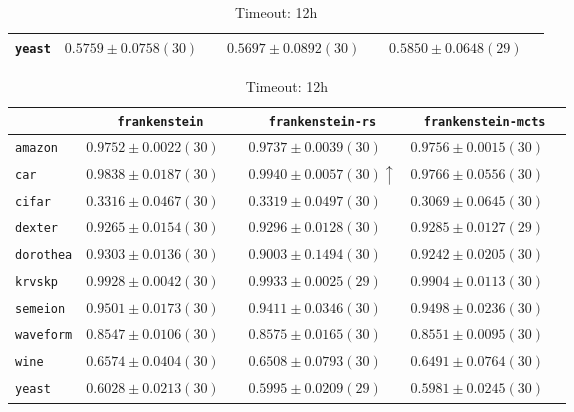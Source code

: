 \begin{table}[ht]
\begin{subtable}{\textwidth}
\begin{tabular}{l|ccc}
            \texttt{yeast} & $ 0.5759 \pm 0.0758 (30) \phantom{\downarrow}$ & $ 0.5697 \pm 0.0892 (30) \phantom{\downarrow}$ & $ 0.5850 \pm 0.0648 (29) \phantom{\downarrow}$\\
            \hline
        \end{tabular}
    \end{subtable}
    \par\bigskip
    \begin{subtable}{\textwidth}
        \centering
        \caption{Timeout: 12h}
        \begin{tabular}{l|ccc}
            & \texttt{frankenstein}  & \texttt{frankenstein-rs}  & \texttt{frankenstein-mcts} \\
            \hline
            \texttt{amazon} & $ 0.9752 \pm 0.0022 (30) \phantom{\downarrow}$ & $ 0.9737 \pm 0.0039 (30) \phantom{\downarrow}$ & $ 0.9756 \pm 0.0015 (30) \phantom{\downarrow}$\\
            \texttt{car} & $ 0.9838 \pm 0.0187 (30) \phantom{\downarrow}$ & $ 0.9940 \pm 0.0057 (30) \uparrow$ & $ 0.9766 \pm 0.0556 (30) \phantom{\downarrow}$\\
            \texttt{cifar} & $ 0.3316 \pm 0.0467 (30) \phantom{\downarrow}$ & $ 0.3319 \pm 0.0497 (30) \phantom{\downarrow}$ & $ 0.3069 \pm 0.0645 (30) \phantom{\downarrow}$\\
            \texttt{dexter} & $ 0.9265 \pm 0.0154 (30) \phantom{\downarrow}$ & $ 0.9296 \pm 0.0128 (30) \phantom{\downarrow}$ & $ 0.9285 \pm 0.0127 (29) \phantom{\downarrow}$\\
            \texttt{dorothea} & $ 0.9303 \pm 0.0136 (30) \phantom{\downarrow}$ & $ 0.9003 \pm 0.1494 (30) \phantom{\downarrow}$ & $ 0.9242 \pm 0.0205 (30) \phantom{\downarrow}$\\
            \texttt{krvskp} & $ 0.9928 \pm 0.0042 (30) \phantom{\downarrow}$ & $ 0.9933 \pm 0.0025 (29) \phantom{\downarrow}$ & $ 0.9904 \pm 0.0113 (30) \phantom{\downarrow}$\\
            \texttt{semeion} & $ 0.9501 \pm 0.0173 (30) \phantom{\downarrow}$ & $ 0.9411 \pm 0.0346 (30) \phantom{\downarrow}$ & $ 0.9498 \pm 0.0236 (30) \phantom{\downarrow}$\\
            \texttt{waveform} & $ 0.8547 \pm 0.0106 (30) \phantom{\downarrow}$ & $ 0.8575 \pm 0.0165 (30) \phantom{\downarrow}$ & $ 0.8551 \pm 0.0095 (30) \phantom{\downarrow}$\\
            \texttt{wine} & $ 0.6574 \pm 0.0404 (30) \phantom{\downarrow}$ & $ 0.6508 \pm 0.0793 (30) \phantom{\downarrow}$ & $ 0.6491 \pm 0.0764 (30) \phantom{\downarrow}$\\
            \texttt{yeast} & $ 0.6028 \pm 0.0213 (30) \phantom{\downarrow}$ & $ 0.5995 \pm 0.0209 (29) \phantom{\downarrow}$ & $ 0.5981 \pm 0.0245 (30) \phantom{\downarrow}$\\
            \hline
        \end{tabular}
    \end{subtable}
\end{table}

